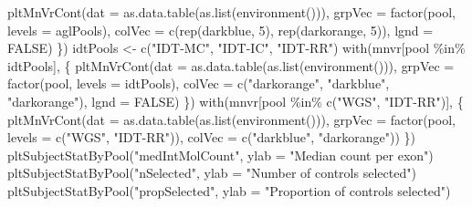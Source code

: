 \documentclass[11pt,letterpaper,oneside]{book}
\newenvironment{Shaded}{\begin{snugshade}}{\end{snugshade}}
\newcommand{\AttributeTok}[1]{\textcolor[rgb]{0.77,0.63,0.00}{#1}}
\newcommand{\ConstantTok}[1]{\textcolor[rgb]{0.00,0.00,0.00}{#1}}
\newcommand{\DecValTok}[1]{\textcolor[rgb]{0.00,0.00,0.81}{#1}}
\newcommand{\FunctionTok}[1]{\textcolor[rgb]{0.00,0.00,0.00}{#1}}
\newcommand{\NormalTok}[1]{#1}
\newcommand{\OtherTok}[1]{\textcolor[rgb]{0.56,0.35,0.01}{#1}}
\newcommand{\SpecialCharTok}[1]{\textcolor[rgb]{0.00,0.00,0.00}{#1}}
\newcommand{\StringTok}[1]{\textcolor[rgb]{0.31,0.60,0.02}{#1}}
\begin{document}
\begin{Shaded}
\begin{Highlighting}[]
  \FunctionTok{pltMnVrCont}\NormalTok{(}\AttributeTok{dat =} \FunctionTok{as.data.table}\NormalTok{(}\FunctionTok{as.list}\NormalTok{(}\FunctionTok{environment}\NormalTok{())),}
              \AttributeTok{grpVec =} \FunctionTok{factor}\NormalTok{(pool, }\AttributeTok{levels =}\NormalTok{ aglPools),}
              \AttributeTok{colVec =} \FunctionTok{c}\NormalTok{(}\FunctionTok{rep}\NormalTok{(}\StringTok{\textquotesingle{}darkblue\textquotesingle{}}\NormalTok{, }\DecValTok{5}\NormalTok{), }\FunctionTok{rep}\NormalTok{(}\StringTok{\textquotesingle{}darkorange\textquotesingle{}}\NormalTok{, }\DecValTok{5}\NormalTok{)),}
              \AttributeTok{lgnd =} \ConstantTok{FALSE}\NormalTok{)}
\NormalTok{\})}
\NormalTok{idtPools }\OtherTok{\textless{}{-}} \FunctionTok{c}\NormalTok{(}\StringTok{"IDT{-}MC"}\NormalTok{, }\StringTok{"IDT{-}IC"}\NormalTok{, }\StringTok{"IDT{-}RR"}\NormalTok{)}
\FunctionTok{with}\NormalTok{(mnvr[pool }\SpecialCharTok{\%in\%}\NormalTok{ idtPools], \{}
  \FunctionTok{pltMnVrCont}\NormalTok{(}\AttributeTok{dat =} \FunctionTok{as.data.table}\NormalTok{(}\FunctionTok{as.list}\NormalTok{(}\FunctionTok{environment}\NormalTok{())),}
              \AttributeTok{grpVec =} \FunctionTok{factor}\NormalTok{(pool, }\AttributeTok{levels =}\NormalTok{ idtPools),}
              \AttributeTok{colVec =} \FunctionTok{c}\NormalTok{(}\StringTok{"darkorange"}\NormalTok{, }\StringTok{"darkblue"}\NormalTok{, }\StringTok{"darkorange"}\NormalTok{),}
              \AttributeTok{lgnd =} \ConstantTok{FALSE}\NormalTok{)}
\NormalTok{\})}
\FunctionTok{with}\NormalTok{(mnvr[pool }\SpecialCharTok{\%in\%} \FunctionTok{c}\NormalTok{(}\StringTok{"WGS"}\NormalTok{, }\StringTok{"IDT{-}RR"}\NormalTok{)], \{}
  \FunctionTok{pltMnVrCont}\NormalTok{(}\AttributeTok{dat =} \FunctionTok{as.data.table}\NormalTok{(}\FunctionTok{as.list}\NormalTok{(}\FunctionTok{environment}\NormalTok{())),}
              \AttributeTok{grpVec =} \FunctionTok{factor}\NormalTok{(pool, }\AttributeTok{levels =} \FunctionTok{c}\NormalTok{(}\StringTok{"WGS"}\NormalTok{, }\StringTok{"IDT{-}RR"}\NormalTok{)),}
              \AttributeTok{colVec =} \FunctionTok{c}\NormalTok{(}\StringTok{"darkblue"}\NormalTok{, }\StringTok{"darkorange"}\NormalTok{))}
\NormalTok{\})}
\FunctionTok{pltSubjectStatByPool}\NormalTok{(}\StringTok{"medIntMolCount"}\NormalTok{, }\AttributeTok{ylab =} \StringTok{"Median count per exon"}\NormalTok{)}
\FunctionTok{pltSubjectStatByPool}\NormalTok{(}\StringTok{"nSelected"}\NormalTok{, }\AttributeTok{ylab =} \StringTok{"Number of controls selected"}\NormalTok{)}
\FunctionTok{pltSubjectStatByPool}\NormalTok{(}\StringTok{"propSelected"}\NormalTok{, }\AttributeTok{ylab =} \StringTok{"Proportion of controls selected"}\NormalTok{)}

\end{Highlighting}
\end{Shaded}
\end{document}
